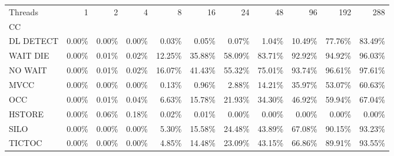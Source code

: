 \begin{tabular}{lrrrrrrrrrr}
\toprule
Threads &   1   &   2   &   4   &    8   &    16  &    24  &    48  &    96  &    192 &    288 \\
CC        &       &       &       &        &        &        &        &        &        &        \\
\midrule
DL DETECT & 0.00\% & 0.00\% & 0.00\% &  0.03\% &  0.05\% &  0.07\% &  1.04\% & 10.49\% & 77.76\% & 83.49\% \\
WAIT DIE  & 0.00\% & 0.01\% & 0.02\% & 12.25\% & 35.88\% & 58.09\% & 83.71\% & 92.92\% & 94.92\% & 96.03\% \\
NO WAIT   & 0.00\% & 0.01\% & 0.02\% & 16.07\% & 41.43\% & 55.32\% & 75.01\% & 93.74\% & 96.61\% & 97.61\% \\
MVCC      & 0.00\% & 0.00\% & 0.00\% &  0.13\% &  0.96\% &  2.88\% & 14.21\% & 35.97\% & 53.07\% & 60.63\% \\
OCC       & 0.00\% & 0.01\% & 0.04\% &  6.63\% & 15.78\% & 21.93\% & 34.30\% & 46.92\% & 59.94\% & 67.04\% \\
HSTORE    & 0.00\% & 0.06\% & 0.18\% &  0.02\% &  0.01\% &  0.00\% &  0.00\% &  0.00\% &  0.00\% &  0.00\% \\
SILO      & 0.00\% & 0.00\% & 0.00\% &  5.30\% & 15.58\% & 24.48\% & 43.89\% & 67.08\% & 90.15\% & 93.23\% \\
TICTOC    & 0.00\% & 0.00\% & 0.00\% &  4.85\% & 14.48\% & 23.09\% & 43.15\% & 66.86\% & 89.91\% & 93.55\% \\
\bottomrule
\end{tabular}
